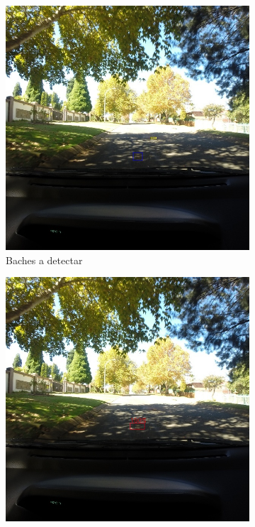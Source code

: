 \begin{figure}[H]
	\centering
	\begin{subfigure}[h]{0.45\linewidth}
		\includegraphics[width=\linewidth]{images/results_e_gt.jpg}
		\caption{Baches a detectar}
	\end{subfigure}
	\begin{subfigure}[h]{0.45\linewidth}
		\includegraphics[width=\linewidth]{images/results_e_yolo_v3_256.jpg}

\end{subfigure}
\end{figure}
